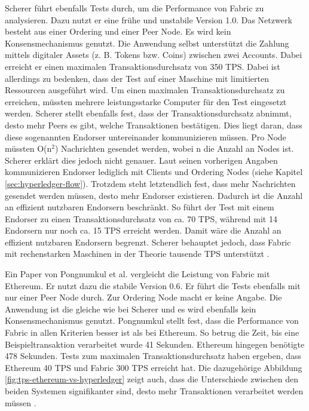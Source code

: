 Scherer führt ebenfalls Tests durch, um die Performance von Fabric zu analysieren. Dazu nutzt er eine frühe und unstabile Version 1.0. Das Netzwerk besteht aus einer Ordering und einer Peer Node. Es wird kein Konsensmechanismus genutzt. Die Anwendung selbst unterstützt die Zahlung mittels digitaler Assets (z. B. Tokens bzw. Coins) zwischen zwei Accounts. Dabei erreicht er einen maximalen Transaktionsdurchsatz von 350 \acs{TPS}. Dabei ist allerdings zu bedenken, dass der Test auf einer Maschine mit limitierten Ressourcen ausgeführt wird. Um einen maximalen Transaktionsdurchsatz zu erreichen, müssten mehrere leistungsstarke Computer für den Test eingesetzt werden. Scherer stellt ebenfalls fest, dass der Transaktionsdurchsatz abnimmt, desto mehr Peers es gibt, welche Transaktionen bestätigen. Dies liegt daran, dass diese sogenannten Endorser untereinander kommunizieren müssen. Pro Node müssten O(n$^2$) Nachrichten gesendet werden, wobei n die Anzahl an Nodes ist. Scherer erklärt dies jedoch nicht genauer. Laut seinen vorherigen Angaben kommunizieren Endorser lediglich mit Clients und Ordering Nodes (siehe Kapitel \ref{sec:hyperledger-flow}). Trotzdem steht letztendlich fest, dass mehr Nachrichten gesendet werden müssen, desto mehr Endorser existieren. Dadurch ist die Anzahl an effizient nutzbaren Endorsern beschränkt. So führt der Test mit einem Endorser zu einen Transaktionsdurchsatz von ca. 70 \acs{TPS}, während mit 14 Endorsern nur noch ca. 15 \acs{TPS} erreicht werden. Damit wäre die Anzahl an effizient nutzbaren Endorsern begrenzt. Scherer behauptet jedoch, dass Fabric mit rechenstarken Maschinen in der Theorie tausende \acs{TPS} unterstützt \cite{SchererPerformanceScalabilityBlockchain2017}.

Ein Paper von Pongnumkul et al. vergleicht die Leistung von Fabric mit Ethereum. Er nutzt dazu die stabile Version 0.6. Er führt die Tests ebenfalls mit nur einer Peer Node durch. Zur Ordering Node macht er keine Angabe. Die Anwendung ist die gleiche wie bei Scherer und es wird ebenfalls kein Konsensmechanismus genutzt. Pongnumkul stellt fest, dass die Performance von Fabric in allen Kriterien besser ist als bei Ethereum. So betrug die Zeit, bis eine Beispieltransaktion verarbeitet wurde 41 Sekunden. Ethereum hingegen benötigte 478 Sekunden. Tests zum maximalen Transaktionsdurchsatz haben ergeben, dass Ethereum 40 \acs{TPS} und Fabric 300 \acs{TPS} erreicht hat. Die dazugehörige Abbildung \ref{fig:tps-ethereum-vs-hyperledger} zeigt auch, dass die Unterschiede zwischen den beiden Systemen signifikanter sind, desto mehr Transaktionen verarbeitet werden müssen \cite{PongnumkulPerformanceAnalysisPrivate2017}.

